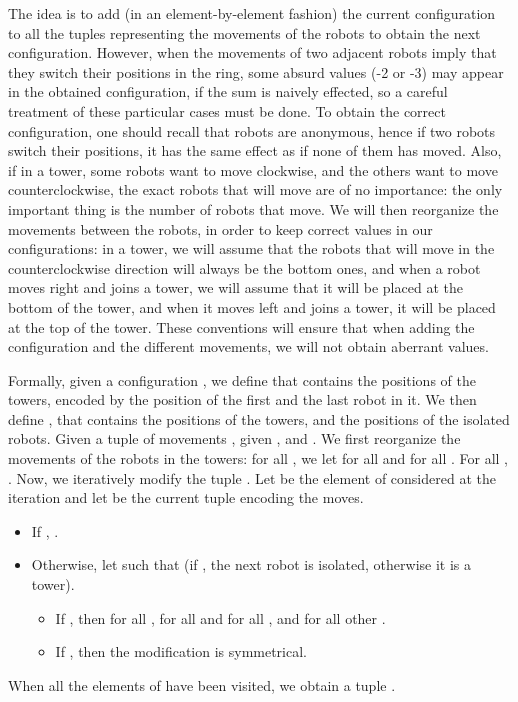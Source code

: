\documentclass[envcountsame]{llncs} \usepackage[english]{babel}
\begin{document}
The idea is to add (in an element-by-element fashion) the current configuration to all the tuples representing the movements of the robots
to obtain the next configuration.
However, when the movements of two adjacent robots imply that they switch their positions
 in the ring, some absurd values (-2 or -3) may appear in the obtained configuration, if the sum is naively effected, so a careful
 treatment of these particular cases must be done. To obtain the correct configuration, one should recall
 that robots are anonymous, hence if two robots switch their positions, it has the same effect as if none of them has moved. Also,
 if in a tower, some robots want to move clockwise, and the others want to move counterclockwise, the exact robots that will move are of no importance:
 the only important thing is the number of robots that move. We will then reorganize the movements between the robots, in order
 to keep correct values in our configurations: in a tower, we will assume that the robots that will move in the counterclockwise direction
 will always be the bottom ones, and when a robot moves right and joins a tower, we will assume that it will be placed at the bottom of the tower,  and when it moves left and joins a tower, it will be placed at the top of the tower. These conventions will ensure that when adding the configuration  and the different movements, we will not obtain aberrant values.
 
 Formally, given a configuration , we define 
 that contains the positions of the towers, encoded by the position of the first and the last robot in it. We then define
, that contains the positions of the towers, and the positions of the isolated robots.
 Given a tuple of movements , given ,  and 
 . We first reorganize the movements of the robots in the towers: 
 for all , we let  for all  and 
  for all . For all , . Now, we iteratively
 modify the tuple . Let  be the element of  considered at the  iteration and let  be the current tuple encoding the moves. 
 \begin{itemize}
\item If , . 
\item Otherwise, let  such that  (if , the next robot is isolated, otherwise it is a tower). 
 \begin{itemize}
 \item If , then  for all 
 ,  for all  and for all , and  for all other . 
 \item If , then the modification is symmetrical. 
 \end{itemize}
 \end{itemize}
 When all the elements of  have been visited, we obtain a tuple .
 
\end{document}

